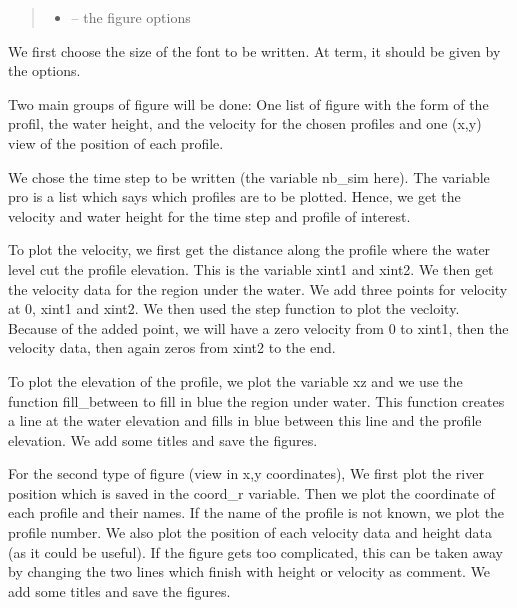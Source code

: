\documentclass[letterpaper,10pt,english]{sphinxmanual}
\begin{document}
\begin{fulllineitems}
\begin{quote}
\begin{description}
\begin{itemize}
\item {} 
 -- the figure options

\end{itemize}

\end{description}\end{quote}


We first choose the size of the font to be written. At term, it should be given by the options.

Two main groups of figure will be done: One list of figure with the form of the profil, the water height, and the
velocity for the chosen profiles and one (x,y) view of the position of each profile.

We chose the time step to be written (the variable nb\_sim here). The variable pro is a list which says which
profiles are to be plotted. Hence, we get the velocity and water height for the time step and profile of interest.

To plot the velocity, we first get the distance along the profile where the water level cut the profile elevation.
This is the variable xint1 and xint2. We then get the velocity data for the region under the water. We add three
points for velocity at 0, xint1 and xint2. We then used the step function to plot the vecloity. Because of the added
point, we will have a zero velocity from 0 to xint1, then the velocity data, then again zeros from xint2 to the end.

To plot the elevation of the profile, we plot the variable xz and we use the function fill\_between to fill
in blue the region under water. This function creates a line at the water elevation and fills in blue between this
line and the profile elevation. We add some titles and save the figures.

For the second type of figure (view in x,y coordinates), We first plot the river position which is saved in the
coord\_r variable. Then we plot the coordinate of each profile and their names. If the name of the profile is not
known, we plot the profile number.  We also plot the position of each velocity data and height data (as it could be
useful). If the figure gets too complicated, this can be taken away by changing the two lines which finish
with height or velocity as comment.  We add some titles and save the figures.

\end{fulllineitems}
\end{document}
